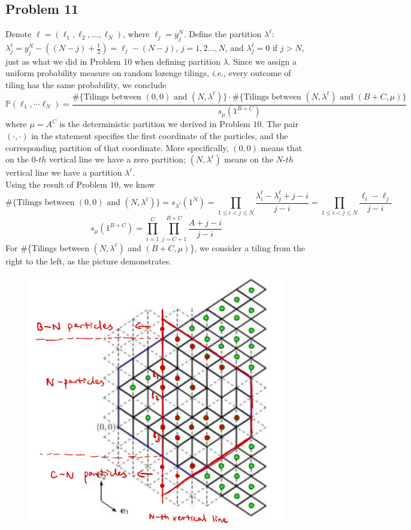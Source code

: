 \documentclass[12pt]{article}
\begin{document}
	\subsection*{Problem 11}
	Denote $\ell=(\ell_{1},\ell_{2},\dots,\ell_{N})$, where $\ell_{j}=y_{j}^{N}$. Define the partition $\lambda^{\ell}$: $\lambda^{\ell}_{j}=y_{j}^{N}-((N-j)+\frac{1}{2})=\ell_{j}-(N-j)$, $j=1,2\dots,N$, and $\lambda_{j}^{\ell}=0$ if $j>N$, just as what we did in Problem 10 when defining partition $\lambda$. Since we assign a uniform probability measure on random lozenge tilings, \emph{i.e.}, every outcome of tiling has the same probability, we conclude $$\mathbb P(\ell_1,\cdots \ell_N)=\frac{\#\{\text{Tilings between $(0,0)$ and $(N,\lambda^{\ell})$}\}\cdot \#\{\text{Tilings between $(N,\lambda^{\ell})$ and $(B+C,\mu)$}\}}{s_\mu(1^{B+C})}$$
	where $\mu=A^{C}$ is the deterministic partition we derived in Problem $10$. The pair $(\cdot,\cdot)$ in the statement specifies the first coordinate of the particles, and the corresponding partition of that coordinate. More specifically, $(0,0)$ means that on the $0$-$th$ vertical line we have a zero partition; $(N,\lambda^{\ell})$ means on the $N$-$th$ vertical line we have a partition $\lambda^{\ell}$.\\
	Using the result of Problem $10$, we know $$\#\{\text{Tilings between $(0,0)$ and $(N,\lambda^{\ell})$}\}=s_{\lambda^{\ell}}(1^{N})=\prod_{1\leqslant i<j\leqslant N}\frac{\lambda^{\ell}_{i}-\lambda^{\ell}_{j}+j-i}{j-i}=\prod_{1\leqslant i<j\leqslant N}\frac{\ell_{i}-\ell_{j}}{j-i}$$
	$$s_{\mu}(1^{B+C})=\prod_{i=1}^{C}\prod_{j=C+1}^{B+C}\frac{A+j-i}{j-i}$$
	For \#\{Tilings between $(N,\lambda^{\ell})$ and $(B+C,\mu)$\}, we consider a tiling from the right to the left, as the picture demonstrates.
	\begin{figure}[h]
		\centering
		\includegraphics[scale=0.2]{converse-tiling}
	\end{figure}  
\end{document}
